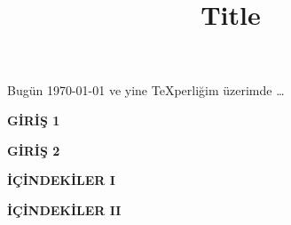 \documentclass[12px]{article}
\begin{document}
\title{\Huge{\textbf{Title}}}
\maketitle
\large{Bugün \today{} ve yine \TeX perliğim üzerimde
\ldots}
\thispagestyle{empty}

\newpage
{}
\begin{center}
    \Huge{\textbf{GİRİŞ 1}}
\end{center}
\newpage

\newpage
\begin{center}
    \Huge{\textbf{GİRİŞ 2}}
\end{center}
\newpage

\newpage 
{}
\begin{center}
    \huge{\textbf{İÇİNDEKİLER I}}
\end{center}
\newpage

\newpage 
\begin{center}
    \huge{\textbf{İÇİNDEKİLER II}}
\end{center}
\newpage


\onehalfspacing
\lipsum[1-2]
\singlespacing
\lipsum[3]

\doublespacing
\lipsum[4-8]

\onehalfspacing
\lipsum[11-15]
\end{document}
